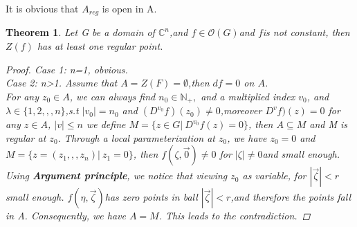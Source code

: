 \documentclass[14pt,reqno]{amsart}
\newtheorem{thm}{Theorem}[section]
\numberwithin{equation}{section}
\begin{document}
It is obvious that $A_{reg}$ is open in A.
\begin{thm}
	Let G be a domain of $\mathbb{C}^{n}$,and $f\in \mathcal{O}(G)$and $f$is not constant, then $Z(f)$ has at least one regular point.
	\begin{proof}
		Case 1: n=1, obvious.\\
		Case 2: n>1.  Assume that $A=Z(F)=\emptyset$,then $df=0$ on $A$.
	\\For any $z_{0}\in A$, we can always find $n_{0}\in \mathbb{N}_{+},$ and a multiplied index $v_{0}$, and $\lambda\in\{1,2,,,n\}$,s.t $|v_{0}|=n_{0}$ and $(D^{v_{0}}f)(z_{0})\neq0$,moreover $D^{v}f)(z)=0$ for any $z\in A$, $|v|\leq n$
	we define $M=\{z\in G|\ D^{v_{0}}f(z)=0\}$, then $A\subseteq M$ and M is regular at $z_{0}$.
	Through a local parameterization  at $z_{0}$, we have $z_{0}=0$ and $M=\{z=(z_{1},,,z_{n})|\  z_{1}=0\}$, then $f(\zeta,\vec{0})\neq0$ for $|\zeta|\neq0$and small enough. Using \textbf{Argument principle}, we notice that viewing $z_{0}$ as variable, for $|\vec{\zeta}|<r$ small enough. $f(\eta,\vec{\zeta})$has zero points in ball $|\vec{\zeta}|<r$,and therefore  the points fall in A. Consequently, we have $A=M$. This leads to the contradiction.
 	\end{proof}
\end{thm}
\end{document}
